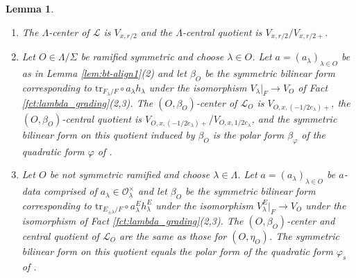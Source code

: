 \documentclass{article}
\def\mc#1{\mathcal{#1}}
\def\cO{\mathcal{O}}
\newtheorem{lem}[thm]{Lemma}
\theoremstyle{definition}
\numberwithin{equation}{subsection}
\renewcommand{\-}{\hyp{}}
\begin{document}
\begin{lem} \label{lem:bt-align}
		 \leavevmode \begin{enumerate} 
		\item The $\Lambda$-center of $\mc{L}$ is $V_{x,r/2}$ and the $\Lambda$-central quotient is $V_{x,r/2}/V_{x,r/2+}$.
		\item Let $O \in \Lambda/\Sigma$ be ramified symmetric and choose $\lambda \in O$. Let $a=(a_\lambda)_{\lambda \in O}$ be as in Lemma \ref{lem:bt-align1}(2) and let $\beta_O$ be the symmetric bilinear form corresponding to  $\mathrm{tr}_{F_\lambda/F}\circ a_\lambda h_\lambda$ under the isomorphism $V_\lambda|_F \to V_O$ of Fact \ref{fct:lambda_grading}(2,3). The $(O,\beta_O)$-center  of $\mc{L}_O$ is $V_{O,x,(-1/2e_\lambda)+}$, the $(O,\beta_O)$-central quotient is $V_{O,x,(-1/2e_\lambda)+}/V_{O,x,1/2e_\lambda}$, and the symmetric bilinear form on this quotient induced by $\beta_O$ is the polar form $\beta_\varphi$ of the quadratic form $\varphi$ of \cite[Definitions 5.4.5, 5.4.8]{FKS23}. 
\item Let $O$ be not symmetric ramified and choose $\lambda \in \Lambda$. Let $a=(a_\lambda)_{\lambda \in O}$ be $a$-data comprised of $a_\lambda \in \cO_\lambda^\times$ and let $\beta_O$ be the symmetric bilinear form corresponding to  $\mathrm{tr}_{E_{\pm\lambda}/F}\circ a_\lambda^E h_\lambda^E$ under the isomorphism $V_\lambda^E|_F \to V_O$ under the isomorphism of Fact \ref{fct:lambda_grading}(2,3). The $(O,\beta_O)$-center and central quotient of $\mc{L}_O$ are the same as those for $(O,\eta_O)$. The symmetric bilinear form on this quotient equals the polar form of the quadratic form $\varphi_s$ of \cite[Remark 5.5.10]{FKS23}.
	\end{enumerate}
\end{lem}
\end{document}
